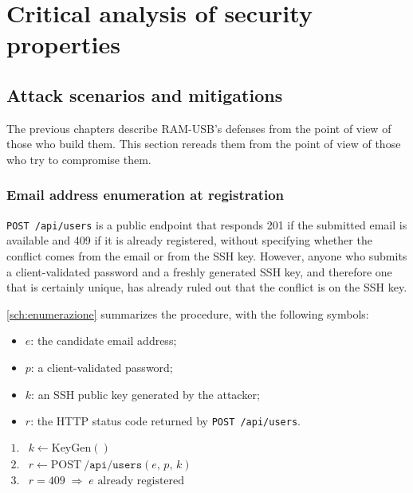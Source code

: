 \chapter{Critical analysis of security properties}
\label{chap:sicurezza}

\section{Attack scenarios and mitigations}
\label{sec:scenari-attacco}

The previous chapters describe RAM-USB's defenses from the point of view of those who build them.
This section rereads them from the point of view of those who try to compromise them.

\subsection{Email address enumeration at registration}

\texttt{POST /api/users} is a public endpoint that responds 201 if the submitted email is available
and 409 if it is already registered, without specifying whether the conflict comes from the email or from the
SSH key. However, anyone who submits a client-validated password and a freshly generated SSH key,
and therefore one that is certainly unique, has already ruled out that the conflict is on the SSH key.

\autoref{sch:enumerazione} summarizes the procedure, with the following symbols:

\begin{itemize}
    \item $e$: the candidate email address;
    \item $p$: a client-validated password;
    \item $k$: an SSH public key generated by the attacker;
    \item $r$: the HTTP status code returned by \texttt{POST /api/users}.
\end{itemize}

\begin{schema}
\centering
$\begin{array}{rl}
1. & k \leftarrow \mathrm{KeyGen}() \\[4pt]
2. & r \leftarrow \mathrm{POST}\ \texttt{/api/users}(e, \, p, \, k) \\[4pt]
3. & r = 409 \;\Longrightarrow\; e \mbox{ already registered}
\end{array}$
\caption{Checking whether an email address is already registered.}
\label{sch:enumerazione}
\end{schema}

